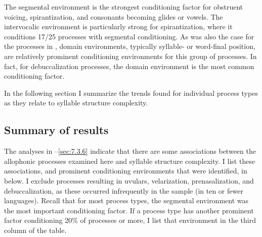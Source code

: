 \begin{table}
\caption{\label{tab:7.6}Conditioning environments for allophonic processes resulting in spirantization, debuccalization, and consonants becoming glides or vowels.}
\end{table}

  The segmental environment is the strongest conditioning factor for obstruent voicing, spirantization, and consonants becoming glides or vowels. The intervocalic environment is particularly strong for spirantization, where it conditions 17/25 processes with segmental conditioning. As was also the case for the processes in , domain environments, typically syllable- or word-final position, are relatively prominent conditioning environments for this group of processes. In fact, for debuccalization processes, the domain environment is the most common conditioning factor.

  In the following section I summarize the trends found for individual process types as they relate to syllable structure complexity.

\subsection{Summary of results} \label{sec:7.3.7}

  The analyses in --\ref{sec:7.3.6} indicate that there are some associations between the allophonic processes examined here and syllable structure complexity. I list these associations, and prominent conditioning environments that were identified, in  below. I exclude processes resulting in uvulars, velarization, prenasalization, and debuccalization, as these occurred infrequently in the sample (in ten or fewer languages). Recall that for most process types, the segmental environment was the most important conditioning factor. If a process type has another prominent factor conditioning 20\% of processes or more, I list that environment in the third column of the table.

